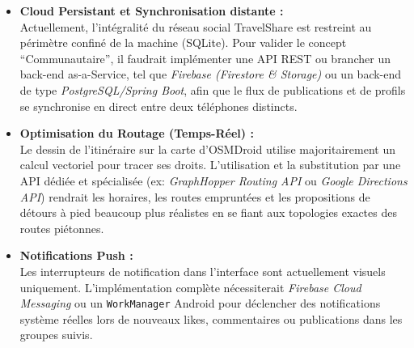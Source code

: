 \documentclass[11pt,a4paper]{article}
\begin{document}
\begin{itemize}[label=\textcolor{primary}{\textbullet}]
    \item \textbf{Cloud Persistant et Synchronisation distante :}\\
    Actuellement, l'intégralité du réseau social TravelShare est restreint au périmètre confiné de la machine (SQLite). Pour valider le concept ``Communautaire'', il faudrait implémenter une API REST ou brancher un back-end as-a-Service, tel que \textit{Firebase (Firestore \& Storage)} ou  un back-end de type \textit{PostgreSQL/Spring Boot}, afin que le flux de publications et de profils se synchronise en direct entre deux téléphones distincts.

    \item \textbf{Optimisation du Routage (Temps-Réel) :}\\
    Le dessin de l'itinéraire sur la carte d'OSMDroid utilise majoritairement un calcul vectoriel pour tracer ses droits. L'utilisation et la substitution par une API dédiée et spécialisée (ex: \textit{GraphHopper Routing API} ou \textit{Google Directions API}) rendrait les horaires, les routes empruntées et les propositions de détours à pied beaucoup plus réalistes en se fiant aux topologies exactes des routes piétonnes.

    \item \textbf{Notifications Push :}\\
    Les interrupteurs de notification dans l'interface sont actuellement visuels uniquement. L'implémentation complète nécessiterait \textit{Firebase Cloud Messaging} ou un \texttt{WorkManager} Android pour déclencher des notifications système réelles lors de nouveaux likes, commentaires ou publications dans les groupes suivis.
\end{itemize}
\end{document}
